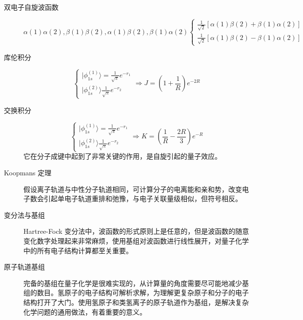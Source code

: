 \documentclass[12pt,a4paper,openany,twoside]{book}
\numberwithin{equation}{section}
\newcommand{\ket}[1]{| #1 \rangle}
\begin{document}
\begin{description}
      \item[双电子自旋波函数]
      \begin{equation}
        \alpha(1)\alpha(2),\beta(1)\beta(2),\alpha(1)\beta(2),\beta(1)\alpha(2)
        \begin{cases}
        \frac{1}{\sqrt{2}}[\alpha(1)\beta(2)+\beta(1)\alpha(2)]\\
        \frac{1}{\sqrt{2}}[\alpha(1)\beta(2)-\beta(1)\alpha(2)]
        \end{cases}
      \end{equation}
  
    \end{description}
    \begin{description}
    \item[库伦积分]
    \begin{equation}
    \begin{cases}
    \ket{\phi_{1s}^{(1)}}=\frac{1}{\sqrt{\pi}}e^{-r_1}\\
    \ket{\phi_{1s}^{(2)}}\frac{1}{\sqrt{\pi}}e^{-r_2}
    \end{cases}
    \Rightarrow J=(1+\frac{1}{R})e^{-2R}
    \end{equation}
  
    \item[交换积分]
    \begin{equation}
    \begin{cases}
    \ket{\phi_{1s}^{(1)}}=\frac{1}{\sqrt{\pi}}e^{-r_1}\\
    \ket{\phi_{1s}^{(2)}}\frac{1}{\sqrt{\pi}}e^{-r_2}
    \end{cases}
    \Rightarrow K=(\frac{1}{R}-\frac{2R}{3})e^{-R}
    \end{equation}
    它在分子成键中起到了非常关键的作用，是自旋引起的量子效应。

    \item[Koopmans 定理]假设离子轨道与中性分子轨道相同，可计算分子的电离能和亲和势，改变电子数会引起单电子轨道重排和弛豫，与电子关联量级相似，但符号相反。

    \item[变分法与基组] Hartree-Fock 变分法中，波函数的形式原则上是任意的，但是波函数的随意变化数字处理起来非常麻烦，使用基组对波函数进行线性展开，对量子化学中的所有电子结构计算都至关重要。
  
    \item[原子轨道基组] 完备的基组在量子化学是很难实现的，从计算量的角度需要尽可能地减少基组的数目。氢原子的电子结构可解析求解，为理解更复杂原子和分子的电子结构打开了大门。使用氢原子和类氢离子的原子轨道作为基组，是解决复杂化学问题的通用做法，有着重要的意义。
  

\end{description}
\end{document}
